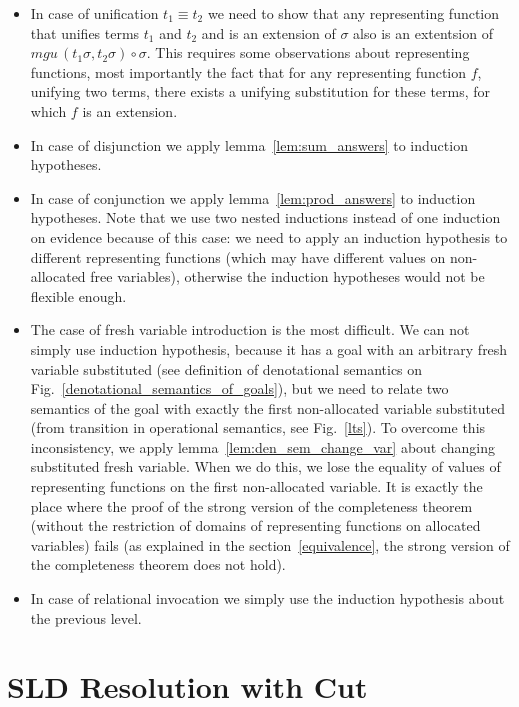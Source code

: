 \begin{itemize}
\item In case of unification $t_1\equiv t_2$ we need to show that any representing function that unifies terms $t_1$ and $t_2$ and is an extension of $\sigma$ also is an extentsion of $mgu\,(t_1 \sigma, t_2 \sigma) \circ \sigma$. This requires some observations about representing functions, most importantly the fact that for any representing function $f$, unifying two terms, there exists a unifying substitution for these terms, for which $f$ is an extension.
\item In case of disjunction we apply lemma~\ref{lem:sum_answers} to induction hypotheses.
\item In case of conjunction we apply lemma~\ref{lem:prod_answers} to induction hypotheses. Note that we use two nested inductions instead of one induction on evidence because of this case: we need to apply an induction hypothesis to different representing functions (which may have different values on non-allocated free variables), otherwise the induction hypotheses would not be flexible enough.
\item The case of fresh variable introduction is the most difficult. We can not simply use induction hypothesis, because it has a goal with an arbitrary fresh variable substituted (see definition of denotational semantics on Fig.~\ref{denotational_semantics_of_goals}), but we need to relate two semantics of the goal with exactly the first non-allocated variable substituted (from transition in operational semantics, see Fig.~\ref{lts}). To overcome this inconsistency, we apply lemma~\ref{lem:den_sem_change_var} about changing substituted fresh variable. When we do this, we lose the equality of values of representing functions on the first non-allocated variable. It is exactly the place where the proof of the strong version of the completeness theorem (without the restriction of domains of representing functions on allocated variables) fails (as explained in the section~\ref{equivalence}, the strong version of the completeness theorem does not hold).
\item In case of relational invocation we simply use the induction hypothesis about the previous level.
\end{itemize}

\section{SLD Resolution with Cut}
\label{appendix_b}

